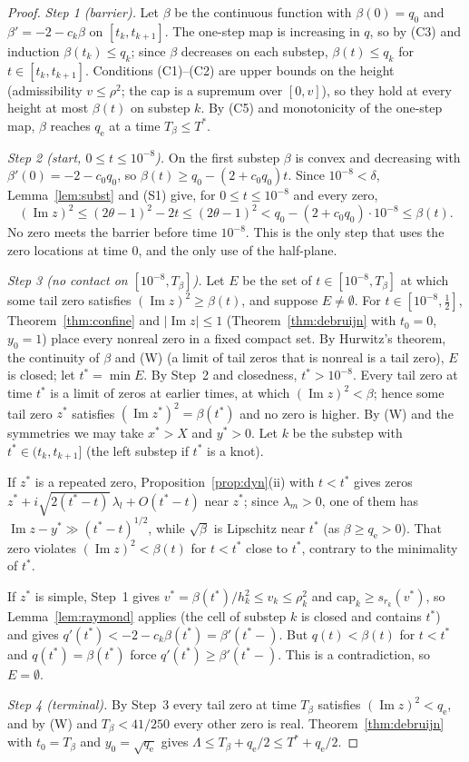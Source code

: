 \documentclass[11pt]{article}
\theoremstyle{definition}
\newcommand{\LB}{\Lambda}
\newcommand{\capo}{\mathrm{cap}}
\newcommand{\qe}{q_{\mathrm e}}
\DeclareMathOperator{\Ima}{Im}
\begin{document}
\begin{proof}
\emph{Step 1 (barrier).} Let $\beta$ be the continuous function with $\beta(0)=q_0$ and
$\beta'=-2-c_k\beta$ on $[t_k,t_{k+1}]$. The one-step map is increasing in $q$, so by (C3)
and induction $\beta(t_k)\le q_k$; since $\beta$ decreases on each substep,
$\beta(t)\le q_k$ for $t\in[t_k,t_{k+1}]$. Conditions (C1)--(C2) are upper bounds on the
height (admissibility $v\le\rho^2$; the cap is a supremum over $[0,v]$), so they hold at
every height at most $\beta(t)$ on substep $k$. By (C5) and monotonicity of the one-step
map, $\beta$ reaches $\qe$ at a time $T_\beta\le T^*$.

\emph{Step 2 (start, $0\le t\le10^{-8}$).} On the first substep $\beta$ is convex and
decreasing with $\beta'(0)=-2-c_0q_0$, so $\beta(t)\ge q_0-(2+c_0q_0)t$. Since
$10^{-8}<\delta$, Lemma~\ref{lem:subst} and (S1) give, for $0\le t\le10^{-8}$ and every zero,
\[
(\Ima z)^2\le(2\theta-1)^2-2t\le(2\theta-1)^2<q_0-(2+c_0q_0)\cdot10^{-8}\le\beta(t).
\]
No zero meets the barrier before time $10^{-8}$. This is the only step that uses the
zero locations at time $0$, and the only use of the half-plane.

\emph{Step 3 (no contact on $[10^{-8},T_\beta]$).} Let $E$ be the set of
$t\in[10^{-8},T_\beta]$ at which some tail zero satisfies $(\Ima z)^2\ge\beta(t)$, and
suppose $E\ne\emptyset$. For $t\in[10^{-8},\frac12]$, Theorem~\ref{thm:confine} and
$|\Ima z|\le1$ (Theorem~\ref{thm:debruijn} with $t_0=0$, $y_0=1$) place every nonreal zero
in a fixed compact set. By Hurwitz's theorem, the continuity of $\beta$ and (W) (a limit
of tail zeros that is nonreal is a tail zero), $E$ is closed; let $t^*=\min E$. By
Step~2 and closedness, $t^*>10^{-8}$. Every tail zero at time $t^*$ is a limit of zeros
at earlier times, at which $(\Ima z)^2<\beta$; hence some tail zero $z^*$ satisfies
$(\Ima z^*)^2=\beta(t^*)$ and no zero is higher. By (W) and the symmetries we may take
$x^*>X$ and $y^*>0$. Let $k$ be the substep with $t^*\in(t_k,t_{k+1}]$ (the left substep if
$t^*$ is a knot).

If $z^*$ is a repeated zero, Proposition~\ref{prop:dyn}(ii) with $t<t^*$ gives zeros
$z^*+i\sqrt{2(t^*-t)}\,\lambda_l+O(t^*-t)$ near $z^*$; since $\lambda_m>0$, one of them has
$\Ima z-y^*\gg(t^*-t)^{1/2}$, while $\sqrt\beta$ is Lipschitz near $t^*$ (as $\beta\ge\qe>0$).
That zero violates $(\Ima z)^2<\beta(t)$ for $t<t^*$ close to $t^*$, contrary to the
minimality of $t^*$.

If $z^*$ is simple, Step~1 gives $v^*=\beta(t^*)/h_k^2\le v_k\le\rho_k^2$ and
$\capo_k\ge s_{r_k}(v^*)$, so Lemma~\ref{lem:raymond} applies (the cell of substep $k$ is
closed and contains $t^*$) and gives $q'(t^*)<-2-c_k\beta(t^*)=\beta'(t^*-)$. But
$q(t)<\beta(t)$ for $t<t^*$ and $q(t^*)=\beta(t^*)$ force $q'(t^*)\ge\beta'(t^*-)$. This is a
contradiction, so $E=\emptyset$.

\emph{Step 4 (terminal).} By Step~3 every tail zero at time $T_\beta$ satisfies
$(\Ima z)^2<\qe$, and by (W) and $T_\beta<41/250$ every other zero is real.
Theorem~\ref{thm:debruijn} with $t_0=T_\beta$ and $y_0=\sqrt{\qe}$ gives
$\LB\le T_\beta+\qe/2\le T^*+\qe/2$.
\end{proof}
\end{document}
